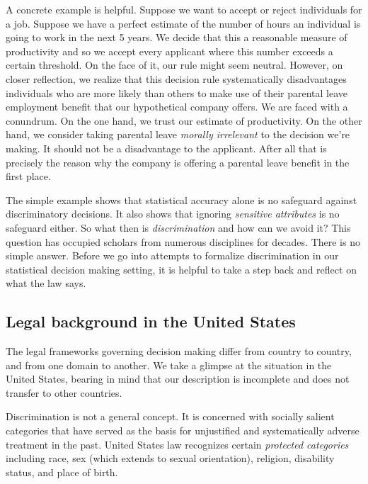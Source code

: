 \documentclass{tufte-book}
\begin{document}
A concrete example is helpful. Suppose we want to accept or reject
individuals for a job. Suppose we have a perfect estimate of the number
of hours an individual is going to work in the next 5 years. We decide
that this a reasonable measure of productivity and so we accept every
applicant where this number exceeds a certain threshold. On the face of
it, our rule might seem neutral. However, on closer reflection, we
realize that this decision rule systematically disadvantages individuals
who are more likely than others to make use of their parental leave
employment benefit that our hypothetical company offers. We are faced
with a conundrum. On the one hand, we trust our estimate of
productivity. On the other hand, we consider taking parental leave
\emph{morally irrelevant} to the decision we're making. It should not be
a disadvantage to the applicant. After all that is precisely the reason
why the company is offering a parental leave benefit in the first place.

The simple example shows that statistical accuracy alone is no safeguard
against discriminatory decisions. It also shows that ignoring
\emph{sensitive attributes} is no safeguard either. So what then is
\emph{discrimination} and how can we avoid it? This question has
occupied scholars from numerous disciplines for decades. There is no
simple answer. Before we go into attempts to formalize discrimination in
our statistical decision making setting, it is helpful to take a step
back and reflect on what the law says.

\hypertarget{legal-background-in-the-united-states}{%
\subsection{Legal background in the United
States}\label{legal-background-in-the-united-states}}

The legal frameworks governing decision making differ from country to
country, and from one domain to another. We take a glimpse at the
situation in the United States, bearing in mind that our description is
incomplete and does not transfer to other countries.

Discrimination is not a general concept. It is concerned with socially
salient categories that have served as the basis for unjustified and
systematically adverse treatment in the past. United States law
recognizes certain \emph{protected categories} including race, sex
(which extends to sexual orientation), religion, disability status, and
place of birth.
\end{document}
